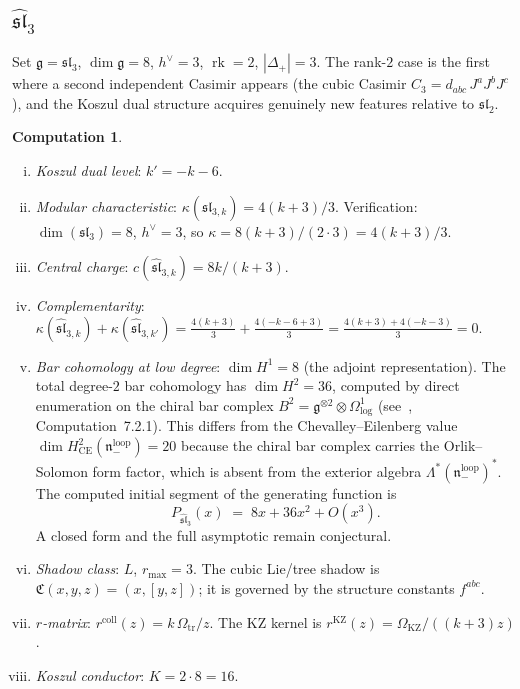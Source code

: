 \documentclass[11pt]{article}
\theoremstyle{plain}
\theoremstyle{definition}
\newtheorem{computation}[theorem]{Computation}
\theoremstyle{remark}
\newcommand{\fg}{\mathfrak{g}}
\newcommand{\fn}{\mathfrak{n}}
\newcommand{\fsl}{\mathfrak{sl}}
\newcommand{\CE}{\mathrm{CE}}
\DeclareMathOperator{\rk}{rk}
\numberwithin{equation}{section}
\begin{document}
\subsection{\texorpdfstring{$\widehat{\fsl}_3$}{sl3-hat}}

Set $\fg = \fsl_3$, $\dim\fg = 8$, $h^\vee = 3$,
$\rk = 2$, $|\Delta_+| = 3$. The rank-$2$ case is
the first where a second independent Casimir appears
(the cubic Casimir $C_3 = d_{abc}\, J^a J^b J^c$),
and the Koszul dual structure acquires genuinely new
features relative to $\fsl_2$.

\begin{computation}\label{comp:sl3}
\begin{enumerate}[(i)]
\item \emph{Koszul dual level}: $k' = -k - 6$.
\item \emph{Modular characteristic}:
 $\kappa(\widehat{\fsl}_{3,k}) = 4(k{+}3)/3$.
 Verification: $\dim(\fsl_3) = 8$, $h^\vee = 3$, so
 $\kappa = 8(k{+}3)/(2 \cdot 3) = 4(k{+}3)/3$.
\item \emph{Central charge}:
 $c(\widehat{\fsl}_{3,k}) = 8k/(k{+}3)$.
\item \emph{Complementarity}:
 $\kappa(\widehat{\fsl}_{3,k}) + \kappa(\widehat{\fsl}_{3,k'})
 = \frac{4(k{+}3)}{3} + \frac{4(-k{-}6{+}3)}{3}
 = \frac{4(k{+}3) + 4(-k{-}3)}{3} = 0$.
\item \emph{Bar cohomology at low degree}:
 $\dim H^1 = 8$ (the adjoint representation).
 The total degree-$2$ bar cohomology has
 $\dim H^2 = 36$, computed by direct enumeration on
 the chiral bar complex
 $B^2 = \fg^{\otimes 2} \otimes \Omega^1_{\log}$
 (see~\cite{Lor-MKD}, Computation~7.2.1).
 This differs from the Chevalley--Eilenberg value
 $\dim H^2_{\CE}(\fn_-^{\mathrm{loop}}) = 20$
 because the chiral bar complex carries the
 Orlik--Solomon form factor, which is absent from
 the exterior algebra
 $\Lambda^*(\fn_-^{\mathrm{loop}})^*$.
 The computed initial segment of the generating function is
 \begin{equation}\label{eq:sl3-gf}
 P_{\widehat{\fsl}_3}(x)
 \;=\; 8x + 36 x^2 + O(x^3).
 \end{equation}
 A closed form and the full asymptotic remain conjectural.
\item \emph{Shadow class}: $L$, $r_{\max} = 3$.
 The cubic Lie/tree shadow is \(\mathfrak C(x,y,z)=(x,[y,z])\);
 it is governed by the structure constants \(f^{abc}\).
\item \emph{$r$-matrix}:
 \(r^{\mathrm{coll}}(z)=k\,\Omega_{\mathrm{tr}}/z\). The KZ kernel is
 \(r^{\mathrm{KZ}}(z)=\Omega_{\mathrm{KZ}}/((k+3)z)\).
\item \emph{Koszul conductor}: $K = 2 \cdot 8 = 16$.
\end{enumerate}
\end{computation}
\end{document}
